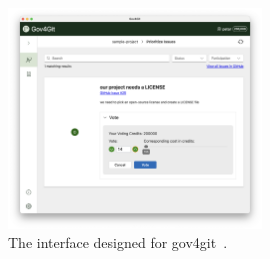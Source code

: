 \begin{figure}[h!]
    \centering
    \includegraphics[width=0.6\textwidth]{content/image/curr_interface/appvote.png}
    \caption{The interface designed for gov4git~\cite{Gov4gitDecentralizedPlatform2023}.}
    \label{fig:gov4gitQV}
\end{figure}

\newpage
